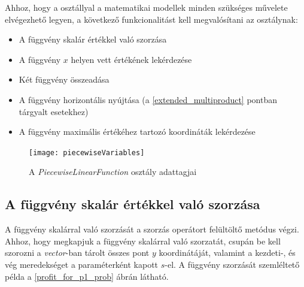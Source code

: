 Ahhoz, hogy a  osztállyal a matematikai modellek minden szükséges művelete elvégezhető legyen, a következő funkcionalitást kell megvalósítani az osztálynak:
\begin{itemize}
\item A függvény skalár értékkel való szorzása
\item A függvény $x$ helyen vett értékének lekérdezése
\item Két függvény összeadása
\item A függvény horizontális nyújtása (a \ref{extended_multiproduct} pontban tárgyalt esetekhez)
\item A függvény maximális értékéhez tartozó koordináták lekérdezése
\end{itemize}
\begin{figure}[H]
\begin{center}
\texttt{[image: piecewiseVariables]}
\caption{A \textit{PiecewiseLinearFunction} osztály adattagjai}
\label{piecewise_variables}
\end{center}
\end{figure}  
\subsection{A függvény skalár értékkel való szorzása} \label{multiplyByScalar}
A függvény skalárral való szorzását a szorzás operátort felültöltő metódus végzi.
Ahhoz, hogy megkapjuk a függvény skalárral való szorzatát, csupán be kell szorozni a \textit{vector}-ban tárolt összes pont $y$ koordinátáját, valamint a kezdeti-, és vég meredekséget a paraméterként kapott $s$-el.
A függvény szorzását szemléltető példa a \ref{profit_for_p1_prob} ábrán látható.
